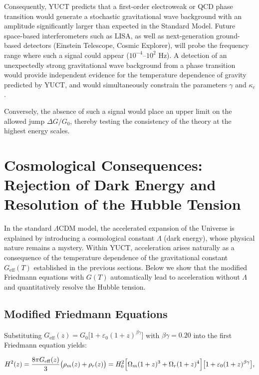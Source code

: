 \documentclass[12pt]{article}
\theoremstyle{remark}
\begin{document}
	Consequently, YUCT predicts that a first-order electroweak or QCD phase 
	transition would generate a stochastic gravitational wave background with an 
	amplitude significantly larger than expected in the Standard Model. 
	Future space-based interferometers such as LISA, as well as next-generation 
	ground-based detectors (Einstein Telescope, Cosmic Explorer), will probe the 
	frequency range where such a signal could appear ($10^{-4}$--$10^{2}$ Hz). 
	A detection of an unexpectedly strong gravitational wave background from a 
	phase transition would provide independent evidence for the temperature 
	dependence of gravity predicted by YUCT, and would simultaneously constrain 
	the parameters $\gamma$ and $\kappa_c$.
	
	Conversely, the absence of such a signal would place an upper limit on the 
	allowed jump $\Delta G/G_0$, thereby testing the consistency of the theory 
	at the highest energy scales.
	
	\section{Cosmological Consequences: Rejection of Dark Energy and Resolution of the Hubble Tension}
	\label{sec:cosmo-consequences}
	
	In the standard \(\Lambda\)CDM model, the accelerated expansion of the Universe is explained by introducing a cosmological constant \(\Lambda\) (dark energy), whose physical nature remains a mystery. Within YUCT, acceleration arises naturally as a consequence of the temperature dependence of the gravitational constant \(G_{\mathrm{eff}}(T)\) established in the previous sections. Below we show that the modified Friedmann equations with \(G(T)\) automatically lead to acceleration without \(\Lambda\) and quantitatively resolve the Hubble tension.
	
	\subsection{Modified Friedmann Equations}
	
	Substituting \(G_{\mathrm{eff}}(z) = G_0\bigl[1 + \varepsilon_0 (1+z)^{\beta\gamma}\bigr]\) with \(\beta\gamma = 0.20\) into the first Friedmann equation yields:
	
	\begin{equation}
		H^2(z) = \frac{8\pi G_{\mathrm{eff}}(z)}{3} \bigl(\rho_m(z) + \rho_r(z)\bigr) = H_0^2\Bigl[\Omega_m (1+z)^3 + \Omega_r (1+z)^4\Bigr]\bigl[1 + \varepsilon_0 (1+z)^{\beta\gamma}\bigr],
		\label{eq:friedman_yuct}
	\end{equation}
	
\end{document}
